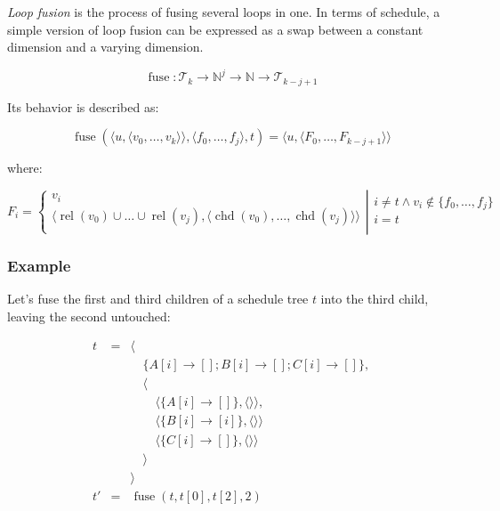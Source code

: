 \documentclass{article}
\DeclareMathOperator\rel{rel}
\DeclareMathOperator\chd{chd}
\DeclareMathOperator\fuse{fuse}
\begin{document}
\emph{Loop fusion} is the process of fusing several loops in one. In terms of
schedule, a simple version of loop fusion can be expressed as a swap between a
constant dimension and a varying dimension.

\[
    \fuse:  \mathcal{T}_k \rightarrow  \mathbb{N}^j \rightarrow \mathbb{N} \rightarrow  \mathcal{T}_{k - j + 1}
\]

Its behavior is described as: 

\[
    \fuse(\langle u, \langle v_0, \ldots, v_k\rangle \rangle, \langle f_0, \ldots, f_j\rangle, t) = \langle  u, \langle F_0, \ldots, F_{k-j+1}\rangle \rangle
\]

\noindent where:

\[
    F_i = \left\{
    \begin{array}{c}
         v_i \\
        \langle \rel(v_0) \cup \ldots \cup \rel(v_j), \langle \chd(v_0), \ldots, \chd(v_j)\rangle  \rangle  \\
    \end{array}
    \right|
    \left.
    \begin{array}{l}
         i \neq t \wedge  v_i \not\in \{f_0, \ldots, f_j\} \\
         i = t \\
    \end{array}
    \right.
\]

\subsubsection*{Example}

Let's fuse the first and third children of a schedule tree $t$ into the third child, leaving the second untouched:

\[
    \begin{array}{lcl}
        t &=& \langle \\
          & & \quad\{A[i] \rightarrow []; B[i] \rightarrow []; C[i] \rightarrow []  \},\\
          & & \quad\langle \\
          & & \quad\quad \langle\{ A[i] \rightarrow [] \}, \langle\rangle\rangle,\\
          & & \quad\quad \langle\{ B[i] \rightarrow [i] \}, \langle\rangle\rangle\\
          & & \quad\quad \langle\{ C[i] \rightarrow [] \}, \langle\rangle\rangle\\
          & & \quad\rangle \\
          & & \rangle \\
        t'&=& \fuse(t, t[0], t[2], 2) \\
    \end{array}
\]
\end{document}
